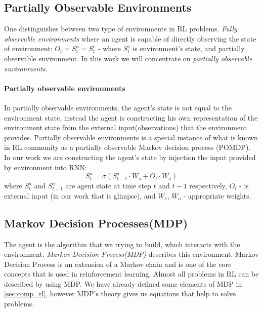 \subsection{Partially Observable Environments}
One distinguishes between two type of environments in RL problems.
\emph{Fully observable environments} where an agent is capable of directly
observing the state of environment:
$O_t = S_t^a = S_t^e$ - where $S_t^e$ is environment's state,
and partially observable environment. In this work we will concentrate
on \emph{partially observable environments}.

\paragraph{Partially observable environments}
In partially observable environments, the agent's state is not equal to the environment state,
instead the agent is constructing his own representation of the environment state from
the external input(observations) that the environment provides.
Partially observable environments is a special instance of what is known in RL community
as a partially observable Markov decision process (POMDP). In our work we are constructing
the agent's state by injection the input provided by environment into RNN:
\begin{equation} \label{eq:rnn_state}
	S_t^a = \sigma(S_{t-1}^a \cdot W_s + O_t \cdot W_o)
\end{equation}
where $S_t^a$ and $S_{t-1}^a$ are agent state at time step $t$ and $t-1$
respectively, $O_t$ - is external input (in our work that is glimpse),
and $W_s$, $W_o$ - appropriate weights.



\subsection{Markov Decision Processes(MDP)} \label{subs:reward_process}
The agent is the algorithm that we trying to build, which interacts with
the environment. \emph{Markov Decision Process(MDP)} describes this environment.
Markov Decision Process is an extension of a Markov chain and is one of the core
concepts that is used in reinforcement learning. Almost all problems in RL
can be described by using MDP. We have already defined some elements of MDP in \autoref{sec:comp_rl},
however MDP's theory gives us equations that help to solve problems.


